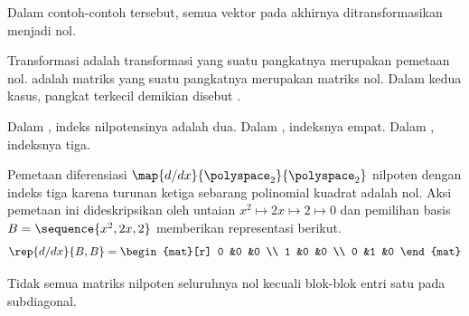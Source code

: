 Dalam contoh-contoh tersebut, semua vektor pada akhirnya ditransformasikan
menjadi nol.

\begin{definition} \label{def:nilpotent} 
Transformasi %
adalah transformasi yang suatu pangkatnya merupakan pemetaan nol.
%
adalah matriks yang suatu pangkatnya merupakan matriks nol.
Dalam kedua kasus, pangkat terkecil demikian disebut
.%
\end{definition}

\begin{example}
Dalam , indeks nilpotensinya adalah dua.
Dalam , indeksnya empat.
Dalam , indeksnya tiga.
\end{example}

\begin{example}
Pemetaan diferensiasi \( \map{d/dx}{\polyspace_2}{\polyspace_2} \)
nilpoten dengan indeks tiga karena turunan ketiga sebarang polinomial
kuadrat adalah nol.
Aksi pemetaan ini dideskripsikan oleh untaian
$x^2\mapsto 2x\mapsto 2\mapsto 0$
dan pemilihan basis \( B=\sequence{x^2,2x,2} \)
memberikan representasi berikut.
\begin{equation*}
  \rep{d/dx}{B,B}=
  \begin{mat}[r]
     0  &0  &0  \\
     1  &0  &0  \\
     0  &1  &0
  \end{mat}
\end{equation*}
\end{example}

Tidak semua matriks nilpoten seluruhnya nol kecuali blok-blok entri satu pada
subdiagonal.

